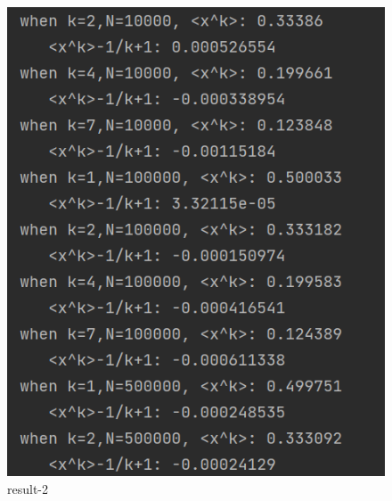 \documentclass{article}
\begin{document}
\begin{figure}[htbp]
\begin{minipage}[t]{0.3\textwidth}
                        \includegraphics[width=\textwidth]{picture/00.png}
                        \caption{result-2}
                        \end{minipage}
                    \begin{minipage}[t]{0.3\textwidth}
                        \centering

\end{minipage}
\end{figure}
\end{document}
